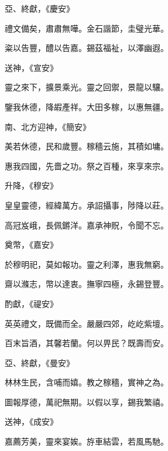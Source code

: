 \begin{pinyinscope}
 亞、終獻，《慶安》



 禮文備矣，肅肅無嘩。金石諧節，圭璧光華。



 粢以告豐，醴以告嘉。錫茲福祉，以澤幽遐。



 送神，《宣安》



 靈之來下，擴景乘光。靈之回禦，景龍以驤。



 鑒我休德，降嘏產祥。大田多稼，以惠無疆。



 南、北方迎神，《簡安》



 美若休德，民和歲豐。稼穡云施，其積如墉。



 惠我四國，先嗇之功。祭之百種，來享來宗。



 升降，《穆安》



 皇皇靈德，經緯萬方。承詔攝事，陟降以莊。



 高冠岌峨，長佩鏘洋。嘉承神貺，令聞不忘。



 奠幣，《嘉安》



 於穆明祀，莫如報功。靈之利澤，惠我無窮。



 齋以滌志，幣以達衷。撫寧四極，永錫登豐。



 酌獻，《禔安》



 英英禮文，既備而全。嚴嚴四郊，屹屹紫壇。



 百末旨酒，其馨若蘭。何以畀民？既壽而安。



 亞、終獻，《曼安》



 林林生民，含哺而嬉。教之稼穡，實神之為。



 圖報厚德，萬祀無期。以假以享，錫我繁禧。



 送神，《成安》



 嘉薦芳美，靈來宴娭。斿車結雲，若風馬馳。




\end{pinyinscope}
